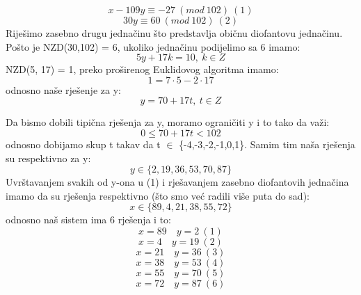 \documentclass[12pt]{article}
\begin{document}
\begin{enumerate}
\begin{equation*}
x - 109y \equiv -27~(mod~102)~(1)
\end{equation*} 
\begin{equation*}
30y \equiv 60~(mod~102)~(2)
\end{equation*} 		
Riješimo zasebno drugu jednačinu što predstavlja običnu diofantovu jednačinu. Pošto je NZD(30,102) = 6, ukoliko
jednačinu podijelimo sa 6 imamo:
\begin{equation*}
5y + 17k = 10,~k \in Z
\end{equation*}
NZD(5, 17) = 1, preko proširenog Euklidovog algoritma imamo:
\begin{equation*}
1 = 7 \cdot 5 - 2 \cdot 17
\end{equation*}
odnosno naše rješenje za y:
\begin{equation*}
y = 70 + 17t,~t \in Z
\end{equation*}

\newpage

Da bismo dobili tipična rješenja za y, moramo ograničiti y i to tako da važi:
\begin{equation*}
0  \leq 70 + 17t < 102
\end{equation*}
odnosno dobijamo skup t takav da t ${\in}$ \{-4,-3,-2,-1,0,1\}.
Samim tim naša rješenja su respektivno za y:
\begin{equation*}
y \in \{2,19,36,53,70,87\}
\end{equation*}
Uvrštavanjem svakih od y-ona u (1) i rješavanjem zasebno diofantovih jednačina imamo da su rješenja respektivno (što smo već radili više puta do sad):
\begin{equation*}
x \in \{89,4,21,38,55,72\}
\end{equation*}
odnosno naš sistem ima 6 rješenja i to:
\begin{equation*}
x = 89 \quad y = 2 ~(1)
\end{equation*}
\begin{equation*}
x = 4 \quad y = 19 ~(2)
\end{equation*}
\begin{equation*}
x = 21 \quad y = 36 ~(3)
\end{equation*}
\begin{equation*}
x = 38 \quad y = 53 ~(4)
\end{equation*}
\begin{equation*}
x = 55 \quad y = 70 ~(5)
\end{equation*}
\begin{equation*} 
x = 72 \quad y = 87 ~(6)
\end{equation*}


\end{enumerate}
\end{document}
